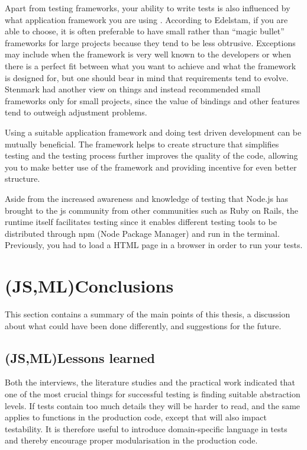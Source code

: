 \documentclass[11pt]{article}
\begin{document}
Apart from testing frameworks, your ability to write tests is also influenced by what application framework you are using \cite[question~8]{Ahnve}. According to Edelstam, if you are able to choose, it is often preferable to have small rather than ``magic bullet'' frameworks for large projects because they tend to be less obtrusive. Exceptions may include when the framework is very well known to the developers or when there is a perfect fit between what you want to achieve and what the framework is designed for, but one should bear in mind that requirements tend to evolve. \cite[questions~48-50]{Edelstam} Stenmark had another view on things and instead recommended small frameworks only for small projects, since the value of bindings and other features tend to outweigh adjustment problems. \cite[questions~12-14]{Stenmark}

Using a suitable application framework and doing test driven development can be mutually beneficial. The framework helps to create structure that simplifies testing and the testing process further improves the quality of the code, allowing you to make better use of the framework and providing incentive for even better structure. \cite[question~15]{Stenmark}

Aside from the increased awareness and knowledge of testing that Node.js has brought to the \gls{js} community from other communities such as Ruby on Rails, the runtime itself facilitates testing since it enables different testing tools to be distributed through npm (Node Package Manager) and run in the terminal. Previously, you had to load a HTML page in a browser in order to run your tests. \cite[question~9]{Stenmark}


\section{(JS,ML)Conclusions}

This section contains a summary of the main points of this thesis, a discussion about what could have been done differently, and suggestions for the future.

\subsection{(JS,ML)Lessons learned}

Both the interviews, the literature studies and the practical work indicated that one of the most crucial things for successful testing is finding suitable abstraction levels. If tests contain too much details they will be harder to read, and the same applies to functions in the production code, except that will also impact testability. It is therefore useful to introduce domain-specific language in tests \cite[p.~127]{Clean} and thereby encourage proper modularisation in the production code.
\end{document}

